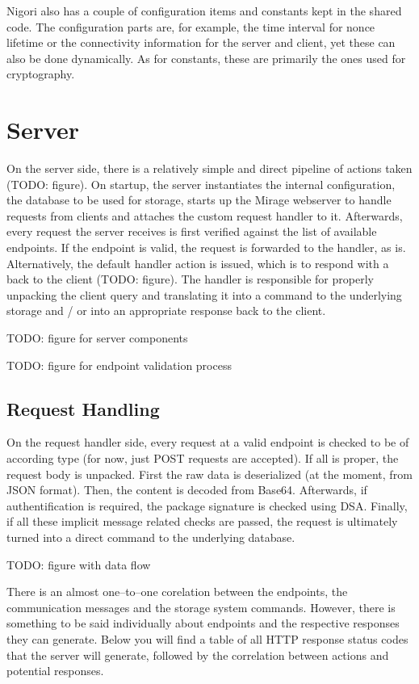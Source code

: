 Nigori also has a couple of configuration items and constants kept in the shared code.
The configuration parts are, for example, the time interval for nonce lifetime or the connectivity information for the server and client, yet these can also be done dynamically.
As for constants, these are primarily the ones used for cryptography.

\section{Server}
On the server side, there is a relatively simple and direct pipeline of actions taken (TODO: figure).
On startup, the server instantiates the internal configuration, the database to be used for storage, starts up the Mirage webserver to handle requests from clients and attaches the custom request handler to it.
Afterwards, every request the server receives is first verified against the list of available endpoints.
If the endpoint is valid, the request is forwarded to the handler, as is.
Alternatively, the default handler action is issued, which is to respond with a  back to the client (TODO: figure).
The handler is responsible for properly unpacking the client query and translating it into a command to the underlying storage and / or into an appropriate response back to the client.

TODO: figure for server components

TODO: figure for endpoint validation process

\subsection{Request Handling}
On the request handler side, every request at a valid endpoint is checked to be of according type (for now, just POST requests are accepted).
If all is proper, the request body is unpacked.
First the raw data is deserialized (at the moment, from JSON format).
Then, the content is decoded from Base64.
Afterwards, if authentification is required, the package signature is checked using DSA.
Finally, if all these implicit message related checks are passed, the request is ultimately turned into a direct command to the underlying database.

TODO: figure with data flow

There is an almost one--to--one corelation between the endpoints, the communication messages and the storage system commands.
However, there is something to be said individually about endpoints and the respective responses they can generate.
Below you will find a table of all HTTP response status codes that the server will generate, followed by the correlation between actions and potential responses.

